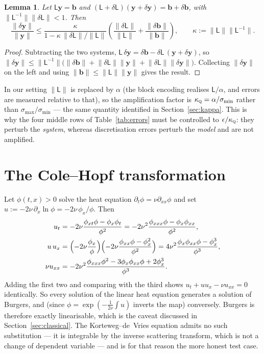 \documentclass[11pt,a4paper]{article}
\theoremstyle{plain}
\newtheorem{lemma}[proposition]{Lemma}
\theoremstyle{definition}
\theoremstyle{remark}
\newcommand{\norm}[1]{\lVert #1 \rVert}
\newcommand{\yvec}{\bm{y}}
\newcommand{\Lmat}{\mathsf{L}}
\newcommand{\kQ}{\kappa_{\textsc{q}}}
\begin{document}
\begin{lemma}
\label{lem:pert}
Let $\Lmat\yvec=\bm b$ and $(\Lmat+\delta\Lmat)(\yvec+\delta\yvec)=\bm b+\delta\bm b$,
with $\norm{\Lmat^{-1}}\norm{\delta\Lmat}<1$.  Then
\begin{equation}
\frac{\norm{\delta\yvec}}{\norm{\yvec}}\le
\frac{\kappa}{1-\kappa\,\norm{\delta\Lmat}/\norm{\Lmat}}
\left(\frac{\norm{\delta\Lmat}}{\norm{\Lmat}}
+\frac{\norm{\delta\bm b}}{\norm{\bm b}}\right),
\qquad \kappa:=\norm{\Lmat}\norm{\Lmat^{-1}}.
\end{equation}
\end{lemma}
\begin{proof}
Subtracting the two systems, $\Lmat\,\delta\yvec
=\delta\bm b-\delta\Lmat\,(\yvec+\delta\yvec)$, so
$\norm{\delta\yvec}\le\norm{\Lmat^{-1}}\bigl(\norm{\delta\bm b}
+\norm{\delta\Lmat}\norm{\yvec}+\norm{\delta\Lmat}\norm{\delta\yvec}\bigr)$.
Collecting $\norm{\delta\yvec}$ on the left and using
$\norm{\bm b}\le\norm{\Lmat}\norm{\yvec}$ gives the result.
\end{proof}

In our setting $\norm{\Lmat}$ is replaced by $\alpha$ (the block encoding
realises $\Lmat/\alpha$, and errors are measured relative to that), so the
amplification factor is $\kQ=\alpha/\sigma_{\min}$ rather than
$\sigma_{\max}/\sigma_{\min}$ --- the same quantity identified in
Section~\ref{sec:kappa}.  This is why the four middle rows of
Table~\ref{tab:errors} must be controlled to $\epsilon/\kQ$: they perturb the
\emph{system}, whereas discretisation errors perturb the \emph{model} and are
not amplified.

\section{The Cole--Hopf transformation}
\label{app:colehopf}

Let $\phi(t,x)>0$ solve the heat equation $\partial_t\phi=\nu\partial_{xx}\phi$
and set $u:=-2\nu\,\partial_x\ln\phi=-2\nu\,\phi_x/\phi$.  Then
\begin{align}
u_t&=-2\nu\frac{\phi_{xt}\phi-\phi_x\phi_t}{\phi^{2}}
=-2\nu^{2}\frac{\phi_{xxx}\phi-\phi_x\phi_{xx}}{\phi^{2}},\\
u\,u_x&=\Bigl(-2\nu\frac{\phi_x}{\phi}\Bigr)
\Bigl(-2\nu\frac{\phi_{xx}\phi-\phi_x^{2}}{\phi^{2}}\Bigr)
=4\nu^{2}\frac{\phi_x\phi_{xx}\phi-\phi_x^{3}}{\phi^{3}},\\
\nu u_{xx}&=-2\nu^{2}\frac{\phi_{xxx}\phi^{2}
-3\phi_x\phi_{xx}\phi+2\phi_x^{3}}{\phi^{3}} .
\end{align}
Adding the first two and comparing with the third shows
$u_t+uu_x-\nu u_{xx}=0$ identically.  So every solution of the linear heat
equation generates a solution of Burgers, and (since $\phi=\exp(-\frac{1}{2\nu}\int u)$
inverts the map) conversely.  Burgers is therefore exactly linearisable, which is
the caveat discussed in Section~\ref{sec:classical}.  The Korteweg--de~Vries
equation admits no such substitution --- it is integrable by the inverse
scattering transform, which is not a change of dependent variable --- and is for
that reason the more honest test case.
\end{document}
